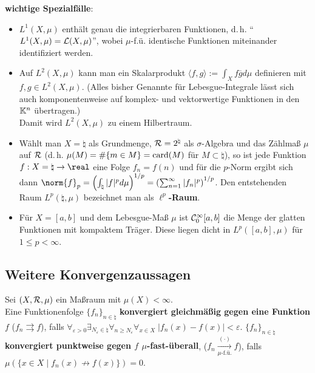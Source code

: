 \textbf{wichtige Spezialfälle}:
\begin{itemize}
    \item
    \textbf{$L^1(X, \mu)$} enthält genau die integrierbaren Funktionen, d.\,h.
    "`$L^1(X, \mu) = \mathcal{L}(X, \mu)$"', wobei $\mu$-f.ü. identische Funktionen
    miteinander identifiziert werden.
    
    \item
    Auf \textbf{$L^2(X, \mu)$} kann man ein Skalarprodukt
    $\langle f, g \rangle:= \int_X f \overline{g} d\mu$ definieren mit \\
    $f, g \in L^2(X, \mu)$.
    (Alles bisher Genannte für Lebesgue-Integrale lässt sich auch
    komponentenweise auf komplex- und vektorwertige Funktionen in den
    $\mathbb{K}^n$ übertragen.) \\
    Damit wird $L^2(X, \mu)$ zu einem Hilbertraum.
    
    \item
    Wählt man $X = \natural$ als Grundmenge, $\mathcal{R} = 2^\natural$ als
    $\sigma$-Algebra und das Zählmaß $\mu$ auf $\mathcal{R}$
    (d.\,h. $\mu(M) = \#\{m \in M\} = \operatorname{card}(M)$ für $M \subset \natural$),
    so ist jede Funktion $f: X = \natural \rightarrow \real$ eine Folge
    $f_n = f(n)$ und für die $p$-Norm ergibt sich dann
    $\norm{f}_p = \left(\int_\natural |f|^p d\mu\right)^{1/p} =
    \left(\sum_{n=1}^\infty |f_n|^p\right)^{1/p}$.
    Den entstehenden Raum $L^p(\natural, \mu)$ bezeichnet man
    als \textbf{$\ell^p$-Raum}.
    
    \item
    Für $X = [a,b]$ und dem Lebesgue-Maß $\mu$ ist \textbf{$\mathcal{C}_0^\infty[a,b]$}
    die Menge der glatten Funktionen mit kompaktem Träger.
    Diese liegen dicht in $L^p([a,b], \mu)$ für $1 \le p < \infty$.
\end{itemize}

\pagebreak

\subsection{%
    Weitere Konvergenzaussagen%
}

Sei $(X, \mathcal{R}, \mu)$ ein Maßraum mit $\mu(X) < \infty$. \\
Eine Funktionenfolge $\{f_n\}_{n \in \natural}$
\textbf{konvergiert gleichmäßig gegen
eine Funktion $f$} ($f_n \rightrightarrows f$), falls
$\forall_{\varepsilon > 0} \exists_{N_\varepsilon \in \natural}
\forall_{n \ge N_\varepsilon} \forall_{x \in X}\;
|f_n(x) - f(x)| < \varepsilon$.
$\{f_n\}_{n \in \natural}$
\textbf{konvergiert punktweise gegen $f$ $\mu$-fast-überall},
($f_n \xrightarrow[\mu\text{-f.ü.}]{(\cdot)} f$), falls
$\mu(\{x \in X \;|\; f_n(x) \not\to f(x)\}) = 0$.

